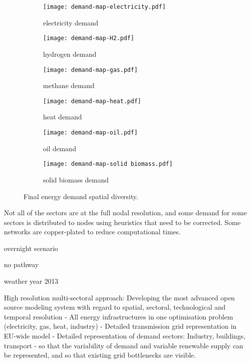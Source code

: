 \begin{figure}
    \centering
    \begin{subfigure}[t]{0.49\textwidth}
        \centering
        \caption{electricity demand}
        \label{fig:demand-space:electricity}
        \texttt{[image: demand-map-electricity.pdf]}
    \end{subfigure}
    \begin{subfigure}[t]{0.49\textwidth}
        \centering
        \caption{hydrogen demand}
        \label{fig:demand-space:hydrogen}
        \texttt{[image: demand-map-H2.pdf]}
    \end{subfigure}
    \begin{subfigure}[t]{0.49\textwidth}
        \centering
        \caption{methane demand}
        \label{fig:demand-space:methane}
        \texttt{[image: demand-map-gas.pdf]}
    \end{subfigure}
    \begin{subfigure}[t]{0.49\textwidth}
        \centering
        \caption{heat demand}
        \label{fig:demand-space:heat}
        \texttt{[image: demand-map-heat.pdf]}
    \end{subfigure}
    \begin{subfigure}[t]{0.49\textwidth}
        \centering
        \caption{oil demand}
        \label{fig:demand-space:oil}
        \texttt{[image: demand-map-oil.pdf]}
    \end{subfigure}
    \begin{subfigure}[t]{0.49\textwidth}
        \centering
        \caption{solid biomass demand}
        \label{fig:demand-space:biomass}
        \texttt{[image: demand-map-solid biomass.pdf]}
    \end{subfigure}
    \caption{Final energy demand spatial diversity.}
    \label{fig:demand-space}
\end{figure}
\restoregeometry



Not all of the sectors are at the full nodal resolution, and some demand for
some sectors is distributed to nodes using heuristics that need to be corrected.
Some networks are copper-plated to reduce computational times.

overnight scenario

no pathway

weather year 2013

High resolution multi-sectoral approach: Developing the most advanced open source modeling system with regard to spatial, sectoral, technological and temporal resolution
- All energy infrastructures in one optimisation problem (electricity, gas, heat, industry)
- Detailed transmission grid representation in EU-wide model
- Detailed representation of demand sectors: Industry, buildings, transport
- so that the variability of demand and variable renewable supply can be represented, and so that existing grid bottlenecks are visible.

